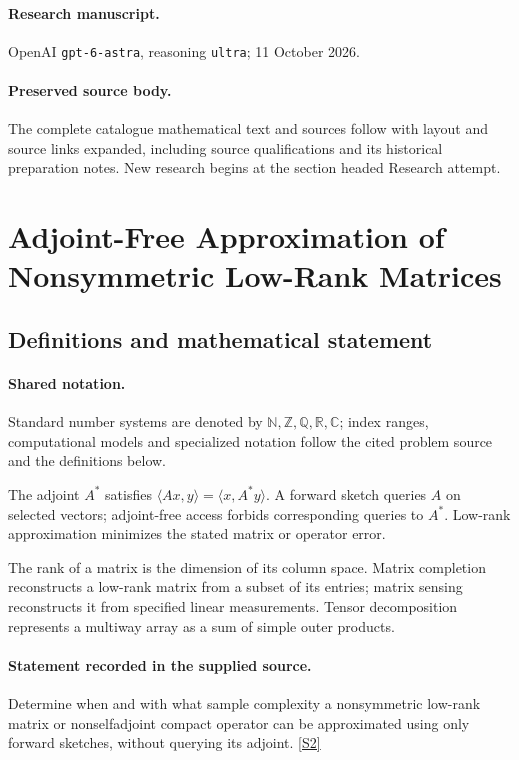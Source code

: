 \documentclass[11pt]{article}
\begin{document}
\paragraph{Research manuscript.} OpenAI \texttt{gpt-6-astra}, reasoning \texttt{ultra}; 11 October 2026.
\paragraph{Preserved source body.} The complete catalogue mathematical text and sources follow with layout and source links expanded, including source qualifications and its historical preparation notes. New research begins at the section headed Research attempt.

\section{Adjoint-Free Approximation of Nonsymmetric Low-Rank Matrices}\label{statement}

\subsection{Definitions and mathematical statement}

\paragraph{Shared notation.}Standard number systems are denoted by $\mathbb N,\mathbb Z,\mathbb Q,\mathbb R,\mathbb C$; index ranges, computational models and specialized notation follow the cited problem source and the definitions below.


The adjoint $A^*$ satisfies $\langle Ax,y\rangle=\langle x,A^*y\rangle$. A forward sketch queries $A$ on selected vectors; adjoint-free access forbids corresponding queries to $A^*$. Low-rank approximation minimizes the stated matrix or operator error.

The rank of a matrix is the dimension of its column space. Matrix completion reconstructs a low-rank matrix from a subset of its entries; matrix sensing reconstructs it from specified linear measurements. Tensor decomposition represents a multiway array as a sum of simple outer products.
\paragraph{Statement recorded in the supplied source.}
Determine when and with what sample complexity a nonsymmetric low-rank matrix or nonselfadjoint compact operator can be approximated using only forward sketches, without querying its adjoint. \href{https://doi.org/10.4171/owr/2024/48}{[S2]}
\end{document}
